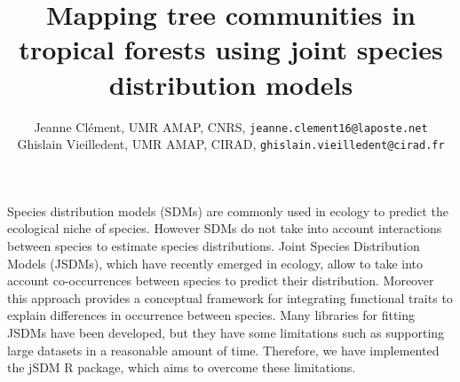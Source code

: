 \documentclass[25pt, a0paper, portrait, dvipsnames, innermargin=5mm, innerblockmargin=1cm, blockverticalspace=5mm, colspace=8mm]{tikzposter}
\title{Mapping tree communities in tropical forests using joint species distribution models}
\author{ \Large{Jeanne Clément}, \large{UMR AMAP, CNRS}, \texttt{jeanne.clement16@laposte.net} \\ \Large{Ghislain Vieilledent}, \large{UMR AMAP, CIRAD, \texttt{ghislain.vieilledent@cirad.fr}} \vspace{-20mm}}
\begin{document}
\maketitle[titletoblockverticalspace=7mm, titletotopverticalspace=-10mm]

{
Species distribution models (SDMs) are commonly used in ecology to predict the ecological niche of species. However SDMs do not take into account interactions between species to estimate species distributions. Joint Species Distribution Models (JSDMs), which have recently emerged in ecology, allow to take into account co-occurrences between species to predict their distribution. Moreover this approach provides a conceptual framework for integrating functional traits to explain differences in occurrence between species. Many libraries for fitting JSDMs have been developed, but they have some limitations such as supporting large datasets in a reasonable amount of time. Therefore, we have implemented the jSDM R package, which aims to overcome these limitations. }
\end{document}
